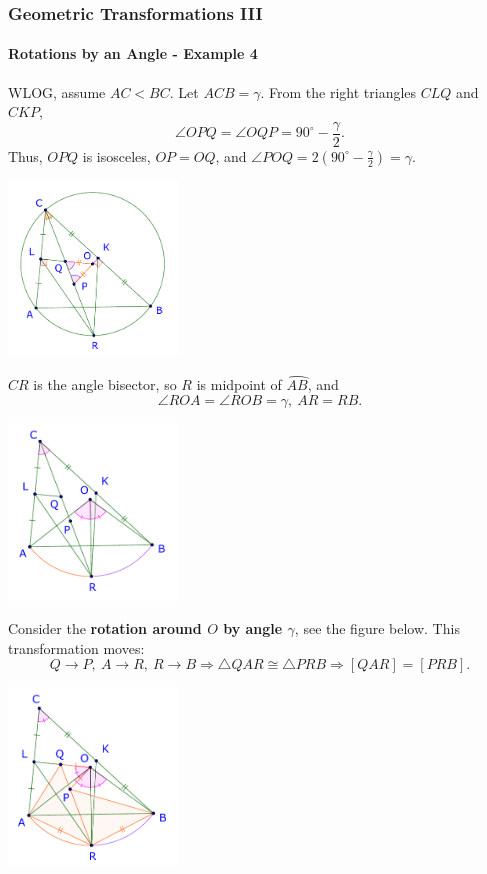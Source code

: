 \documentclass[8pt,xcolor=table,dvipsnames]{beamer}
\newcommand{\dg}{^\circ}
\newcommand{\arc}[1]{\wideparen{#1}}
\begin{document}
\begin{frame}[t]
    \frametitle{Geometric Transformations III}
    \framesubtitle{Rotations by an Angle - Example 4}
    \begin{overprint}
        WLOG, assume $AC<BC$. Let $ACB=\gamma$.
        From the right triangles $CLQ$ and $CKP$, 
        \[
            \angle OPQ=\angle OQP=90\dg - \frac{\gamma}{2}.
        \]
        Thus, $OPQ$ is isosceles, $OP=OQ$, and $\angle POQ=2\left(90\dg - \frac{\gamma}{2}\right)= \gamma$.
        \begin{center}
            \includegraphics[width=4.5cm]{./svg/pdf/imo-2007-4-2.pdf}
        \end{center}
        $CR$ is the angle bisector, so $R$ is midpoint of $\arc{AB}$, and 
        \[
            \angle ROA=\angle ROB=\gamma,\ AR = RB.
        \]
        \begin{center}
            \includegraphics[width=4.5cm]{./svg/pdf/imo-2007-4-3.pdf}
        \end{center}
        Consider the \textbf{rotation around $O$ by angle $\gamma$}, see the figure below.
        This transformation moves:
        \[
            Q \rightarrow P,\ A \rightarrow R,\ R \rightarrow B \Rightarrow \triangle QAR \cong \triangle PRB \Rightarrow [QAR] = [PRB].
        \]
        \begin{center}
            \includegraphics[width=4.5cm]{./svg/pdf/imo-2007-4-4.pdf}

\end{center}
\end{overprint}
\end{frame}
\end{document}
